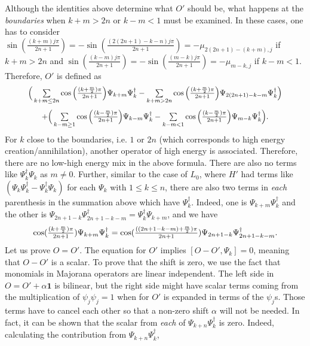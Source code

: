 \documentclass[twoside,11pt,titlepage]{amsart}
\renewcommand{\=}[1]{\stackrel{#1}{=}} %
\theoremstyle{definition}
\theoremstyle{remark}
\begin{document}
Although the identities above determine what $O'$ should be, what happens at the \textit{boundaries} when $k+m>2n$ or $k-m<1$ must be examined. In these cases, one has to consider $\sin(\frac{(k+m)j\pi}{2n+1})=-\sin(\frac{(2(2n+1)-k-n)j\pi}{2n+1})=-\mu_{2(2n+1)-(k+m),j}$ if $k+m>2n$ and $\sin(\frac{(k-m)j\pi}{2n+1})=-\sin(\frac{(m-k)j\pi}{2n+1})=-\mu_{m-k,j}$ if $k-m<1$. Therefore, $O'$ is defined as
\begin{gather}\label{eq32}
\scalebox{0.93}{$
\Big(\sum\limits_{k+m \le 2n} \cos\Big(\frac{(k+\frac{m}{2})\pi}{2n+1}\Big) \Psi_{k+m}\Psi_{k}^\dagger-\sum\limits_{k+m>2n} \cos\Big(\frac{(k+\frac{m}{2})\pi}{2n+1}\Big)\Psi_{2(2n+1)-k-m}\Psi_{k}^\dagger \Big)$}
\end{gather}
\begin{gather*}
\scalebox{0.93}{$+\Big(\sum\limits_{k-m \ge 1} \cos\Big(\frac{(k-\frac{m}{2})\pi}{2n+1}\Big)\Psi_{k-m}\Psi_{k}^\dagger-\sum\limits_{k-m<1} \cos\Big(\frac{(k-\frac{m}{2})\pi}{2n+1}\Big)\Psi_{m-k}\Psi_{k}^\dagger \Big).$}
\end{gather*}
For $k$ close to the boundaries, i.e. $1$ or $2n$ (which corresponds to high energy creation/annihilation), another operator of high energy is associated. Therefore, there are no low-high energy mix in the above formula. There are also no terms like $\Psi_k^\dagger \Psi_k$ as $m \neq 0$. Further, similar to the case of $L_0$, where $H'$ had terms like $(\Psi_k\Psi_k^\dagger-\Psi_k^\dagger \Psi_k)$ for each $\Psi_k$ with $1 \le k \le n$, there are also two terms in \textit{each} parenthesis in the summation above which have $\Psi_k^\dagger$. Indeed, one is $\Psi_{k+m}\Psi_k^\dagger$ and the other is $\Psi_{2n+1-k}\Psi_{2n+1-k-m}^\dagger=\Psi_{k}^\dagger\Psi_{k+m}$, and we have
\begin{gather*}
\scalebox{0.99}{$\cos(\frac{(k+\frac{m}{2})\pi}{2n+1})\Psi_{k+m}\Psi_k^\dagger=\cos(\frac{((2n+1-k-m)+\frac{m}{2})\pi}{2n+1})\Psi_{2n+1-k}\Psi_{2n+1-k-m}^\dagger.$}
\end{gather*}
Let us prove $O=O'$. The equation for $O'$ implies $[O-O',\Psi_k]=0$, meaning that $O-O'$ is a scalar. To prove that the shift is zero, we use the fact that monomials in Majorana operators are linear independent. The left side in $O=O'+\alpha\textbf{1}$ is bilinear, but the right side might have scalar terms coming from the multiplication of $\psi_j\psi_j=1$ when for $O'$ is expanded in terms of the $\psi_j$s. Those terms have to cancel each other so that a non-zero shift $\alpha$ will not be needed. In fact, it can be shown that the scalar from \textit{each} of $\Psi_{k+n}\Psi_k^\dagger$ is zero. Indeed, calculating the contribution from $\Psi_{k+n}\Psi_k^\dagger$, 
\end{document}
